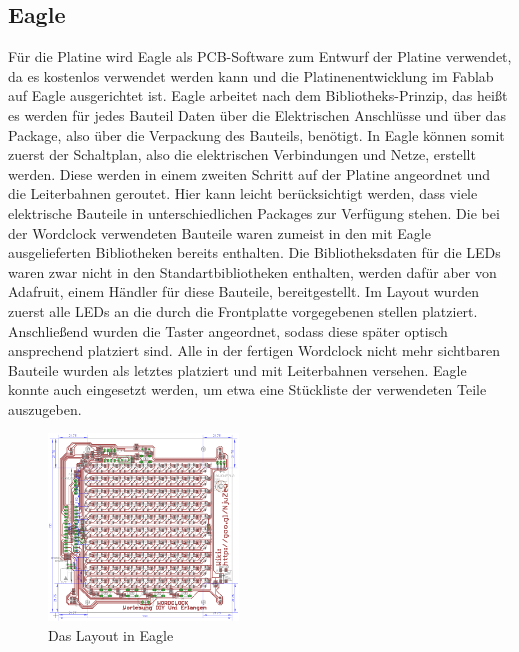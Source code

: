 \documentclass[12pt,journal,compsoc]{IEEEtran}
\begin{document}
\subsection{Eagle}
Für die Platine wird Eagle als PCB-Software zum Entwurf der Platine verwendet, da es kostenlos verwendet werden kann und die Platinenentwicklung im Fablab auf Eagle ausgerichtet ist. Eagle arbeitet nach dem Bibliotheks-Prinzip, das heißt es werden für jedes  Bauteil Daten über die Elektrischen Anschlüsse und über das Package, also über die Verpackung des Bauteils, benötigt. In Eagle können somit  zuerst der Schaltplan, also die elektrischen Verbindungen und Netze, erstellt werden. Diese werden in einem zweiten Schritt auf der Platine angeordnet und die Leiterbahnen geroutet. Hier kann leicht berücksichtigt werden, dass viele elektrische Bauteile in unterschiedlichen Packages zur Verfügung stehen. Die bei der Wordclock verwendeten Bauteile waren zumeist in den mit Eagle ausgelieferten Bibliotheken bereits enthalten. Die Bibliotheksdaten für die LEDs waren zwar nicht in den Standartbibliotheken enthalten, werden dafür aber von Adafruit, einem Händler für diese Bauteile, bereitgestellt. Im Layout wurden zuerst alle LEDs an die durch die Frontplatte vorgegebenen stellen platziert. Anschließend wurden die Taster angeordnet, sodass diese später optisch ansprechend platziert sind. Alle in der fertigen Wordclock nicht mehr sichtbaren Bauteile wurden als letztes platziert und mit Leiterbahnen versehen. Eagle konnte auch eingesetzt werden, um etwa eine Stückliste der verwendeten Teile auszugeben.
\begin{figure}
	\centering
	\includegraphics[width=0.45\textwidth]{Bilder/Eagle.png}
	\caption{Das Layout in Eagle} 
	\label{fig:EagleL}
\end{figure}
\end{document}
